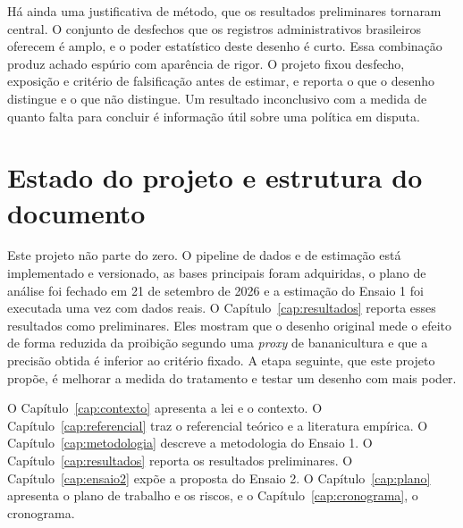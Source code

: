 Há ainda uma justificativa de método, que os resultados preliminares tornaram
central. O conjunto de desfechos que os registros administrativos brasileiros
oferecem é amplo, e o poder estatístico deste desenho é curto. Essa combinação
produz achado espúrio com aparência de rigor. O projeto fixou desfecho,
exposição e critério de falsificação antes de estimar, e reporta o que o
desenho distingue e o que não distingue. Um resultado inconclusivo com a medida
de quanto falta para concluir é informação útil sobre uma política em disputa.

\section{Estado do projeto e estrutura do documento}
\label{sec:estado}

Este projeto não parte do zero. O pipeline de dados e de estimação está
implementado e versionado, as bases principais foram adquiridas, o plano de
análise foi fechado em 21 de setembro de 2026 e a estimação do Ensaio 1 foi
executada uma vez com dados reais. O Capítulo~\ref{cap:resultados} reporta
esses resultados como preliminares. Eles mostram que o desenho original mede o
efeito de forma reduzida da proibição segundo uma \emph{proxy} de bananicultura
e que a precisão obtida é inferior ao critério fixado. A etapa seguinte, que
este projeto propõe, é melhorar a medida do tratamento e testar um desenho com
mais poder.

O Capítulo~\ref{cap:contexto} apresenta a lei e o contexto.
O Capítulo~\ref{cap:referencial} traz o referencial teórico e a literatura
empírica. O Capítulo~\ref{cap:metodologia} descreve a metodologia do Ensaio 1.
O Capítulo~\ref{cap:resultados} reporta os resultados preliminares.
O Capítulo~\ref{cap:ensaio2} expõe a proposta do Ensaio 2.
O Capítulo~\ref{cap:plano} apresenta o plano de trabalho e os riscos, e o
Capítulo~\ref{cap:cronograma}, o cronograma.
